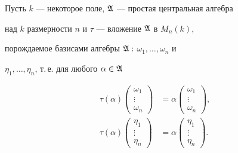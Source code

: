  


\begin{lem} 


Пусть $k$ --- некоторое поле, $\frak A$ --- простая центральная алгебра 


над $k$ размерности $n$ и $\tau$ --- вложение $\frak A$ в $M_n(k)$, 


порождаемое базисами алгебры $\frak A:$ $\omega_1,\dotsc,\omega_n$ и 


$\eta_1,\dotsc,\eta_n$, т.\,е. для любого $\alpha\in\frak A$ 


\begin{equation} 


\begin{split} 


\tau(\alpha) 


\begin{pmatrix} 


\omega_1 \\ \vdots \\ \omega_n 


\end{pmatrix} 


&=\alpha 


\begin{pmatrix} 


\omega_1 \\ \vdots \\ \omega_n 


\end{pmatrix} 


, \\ 


\tau(\alpha) 


\begin{pmatrix} 


\eta_1 \\ \vdots \\ \eta_n 


\end{pmatrix} 


&=\alpha 


\begin{pmatrix} 


\eta_1 \\ \vdots \\ \eta_n 


\end{pmatrix} 


. 


\end{split} 



\end{equation}
\end{lem}
